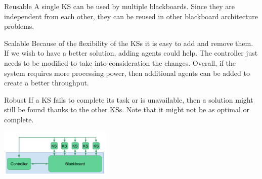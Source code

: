 \begin{nfps}
\item[Reusable] A single KS can be used by multiple blackboards. Since they are independent from each other, they can be reused in other blackboard architecture problems.

\item[Scalable] Because of the flexibility of the KSs it is easy to add and
    remove them. If we wish to have a better solution, adding agents could
    help. The controller just needs to be modified to take into consideration
    the changes. Overall, if the system requires more processing power, then
    additional agents can be added to create a better throughput.

\item[Robust] If a KS fails to complete its task or is unavailable, then a
    solution might still be found thanks to the other KSs. Note that it might
    not be as optimal or complete.

\end{nfps}

\begin{center}
    \includegraphics[width=0.4\textwidth]{./blackboard}
\end{center}
